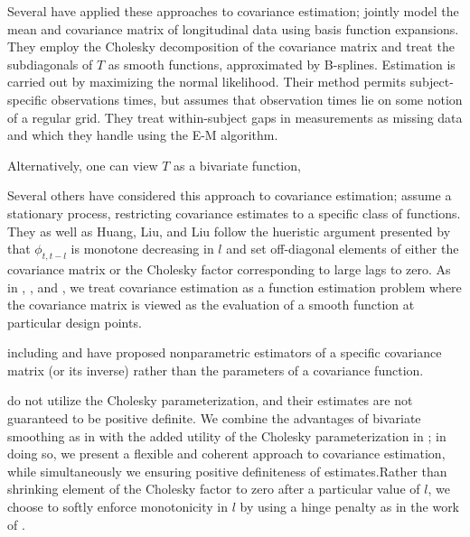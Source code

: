 \documentclass[12pt]{article}
\theoremstyle{definition}
\begin{document}
{{\bigskip

Several have applied these approaches to covariance estimation; \citet{huang2007estimation} jointly model the mean and covariance matrix of longitudinal data using basis function expansions. They employ the Cholesky decomposition of the covariance matrix and treat the subdiagonals of $T$ as smooth functions, approximated by B-splines. Estimation is carried out by maximizing the normal likelihood. Their method permits subject-specific observations times, but assumes that observation times lie on some notion of a regular grid. They treat within-subject gaps in measurements as missing data and which they handle using the E-M algorithm. 

\bigskip

Alternatively, one can view $T$ as a bivariate function,

Several others have considered this approach to covariance estimation; \citet{kaufman2008covariance} assume a stationary process, restricting covariance estimates to a specific class of functions.  They as well as  Huang, Liu, and Liu \citet{huang2007estimation} follow the hueristic argument presented by \citet{pourahmadi1999joint} that $\phi_{t,t-l}$ is monotone decreasing in $l$ and set off-diagonal elements of either the covariance matrix or the Cholesky factor corresponding to large lags to zero.   As in \citet{huang2007estimation}, \citet{kaufman2008covariance}, and \citet{yao2005functional}, we treat covariance estimation as a function estimation problem where the covariance matrix is viewed as the evaluation of a smooth function at particular design points. 

including \citet{bickel2008regularized} and \citet{huang2006covariance}  have proposed nonparametric estimators of a specific covariance matrix (or its inverse) rather than the parameters of a covariance function. 

\bigskip

\citet{yao2005functional} do not utilize the Cholesky parameterization, and their estimates are not guaranteed to be positive definite.  We combine the advantages of bivariate smoothing as in \citet{yao2005functional} with the added utility of the Cholesky parameterization in \citet{huang2007estimation}; in doing so, we present a flexible and coherent approach to covariance estimation, while simultaneously we ensuring positive definiteness of estimates.Rather than shrinking element of the Cholesky factor to zero after a particular value of $l$, we choose to softly enforce monotonicity in $l$ by using a hinge penalty as in the work of \citet{tibshirani2011nearly}. 

}}
\end{document}
